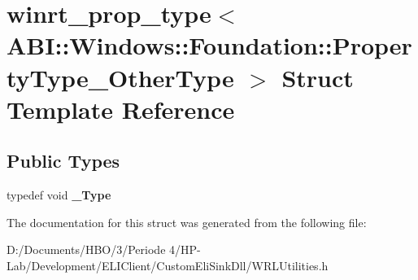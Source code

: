 \hypertarget{structwinrt__prop__type_3_01_a_b_i_1_1_windows_1_1_foundation_1_1_property_type___other_type_01_4}{}\section{winrt\+\_\+prop\+\_\+type$<$ A\+BI\+:\+:Windows\+:\+:Foundation\+:\+:Property\+Type\+\_\+\+Other\+Type $>$ Struct Template Reference}
\label{structwinrt__prop__type_3_01_a_b_i_1_1_windows_1_1_foundation_1_1_property_type___other_type_01_4}
\subsection*{Public Types}
\begin{DoxyCompactItemize}
\item 
\mbox{\label{structwinrt__prop__type_3_01_a_b_i_1_1_windows_1_1_foundation_1_1_property_type___other_type_01_4_aee019573c9966c260190fe640b9bde78}} 
typedef void {\bfseries \+\_\+\+Type}
\end{DoxyCompactItemize}


The documentation for this struct was generated from the following file\+:\begin{DoxyCompactItemize}
\item 
D\+:/\+Documents/\+H\+B\+O/3/\+Periode 4/\+H\+P-\/\+Lab/\+Development/\+E\+L\+I\+Client/\+Custom\+Eli\+Sink\+Dll/W\+R\+L\+Utilities.\+h\end{DoxyCompactItemize}
